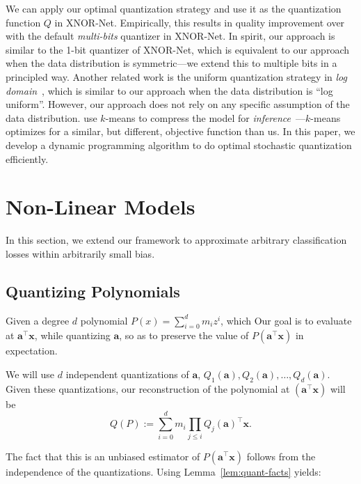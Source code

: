 \documentclass{article}
\renewcommand{\vec}[1]{\mathbf{#1}}
\begin{document}
We can apply our optimal quantization strategy 
and use it as the quantization function $Q$
in XNOR-Net. Empirically, this results in 
quality improvement
over with the default {\em multi-bits} quantizer in XNOR-Net. 
In spirit, our approach is similar to the 1-bit quantizer of
XNOR-Net, which is equivalent to our approach when the data
distribution is symmetric---we extend this
to multiple bits in a principled way. Another related work
is the uniform quantization strategy 
in {\em log domain}~\cite{miyashita2016convolutional},
which is similar to our approach when the data distribution
is ``log uniform''. However, our approach does not rely on
any specific assumption of the data distribution.
\citet{Han:2016:ICLR} use $k$-means to
compress the model for {\em inference}~---$k$-means
optimizes for a similar, but different, objective
function than us. In this paper, we 
develop a dynamic
programming algorithm to do optimal stochastic quantization efficiently.



\vspace{-1em}
\section{Non-Linear Models}
\vspace{-0.5em}

In this section, we extend our framework to approximate arbitrary classification losses within arbitrarily small bias. 

\vspace{-0.5em}
\subsection{Quantizing Polynomials} 
\vspace{-0.5em}

Given a degree $d$ polynomial $P(x) = \sum_{i = 0}^{d} m_i z^i$, which
Our goal is to evaluate at $\vec{a}^\top \vec{x}$, while quantizing $\vec{a}$, so as to preserve the value of $P( \vec{a}^\top \vec{x})$ in expectation. 

We will use $d$ independent quantizations of $\vec{a}$, $Q_1(\vec{a}), Q_2(\vec{a}), \ldots, Q_d(\vec{a})$. 
Given these quantizations, our reconstruction of the polynomial at $( \vec{a}^\top \vec{x})$ will be 
\vspace{-0.5em}
$$ Q(P) := \sum_{i = 0}^d m_i \prod_{j \leq i} Q_j(\vec{a})^\top \vec{x}.$$

\vspace{-1em}
The fact that this is an unbiased estimator of $P( \vec{a}^\top \vec{x} )$ follows from the independence of the quantizations. Using Lemma~\ref{lem:quant-facts} yields:
\end{document}
